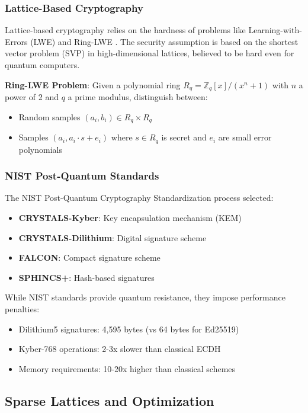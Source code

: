 \documentclass[11pt,a4paper]{article}
\begin{document}
\subsubsection{Lattice-Based Cryptography}

Lattice-based cryptography relies on the hardness of problems like Learning-with-Errors (LWE) and Ring-LWE \cite{regev2005,lyubashevsky2010}. The security assumption is based on the shortest vector problem (SVP) in high-dimensional lattices, believed to be hard even for quantum computers.

\textbf{Ring-LWE Problem}: Given a polynomial ring $R_q = \mathbb{Z}_q[x]/(x^n+1)$ with $n$ a power of 2 and $q$ a prime modulus, distinguish between:
\begin{itemize}
    \item Random samples $(a_i, b_i) \in R_q \times R_q$
    \item Samples $(a_i, a_i \cdot s + e_i)$ where $s \in R_q$ is secret and $e_i$ are small error polynomials
\end{itemize}

\subsubsection{NIST Post-Quantum Standards}

The NIST Post-Quantum Cryptography Standardization process \cite{nist2022} selected:
\begin{itemize}
    \item \textbf{CRYSTALS-Kyber}: Key encapsulation mechanism (KEM)
    \item \textbf{CRYSTALS-Dilithium}: Digital signature scheme
    \item \textbf{FALCON}: Compact signature scheme
    \item \textbf{SPHINCS+}: Hash-based signatures
\end{itemize}

While NIST standards provide quantum resistance, they impose performance penalties:
\begin{itemize}
    \item Dilithium5 signatures: 4,595 bytes (vs 64 bytes for Ed25519)
    \item Kyber-768 operations: 2-3x slower than classical ECDH
    \item Memory requirements: 10-20x higher than classical schemes
\end{itemize}

\subsection{Sparse Lattices and Optimization}
\end{document}

